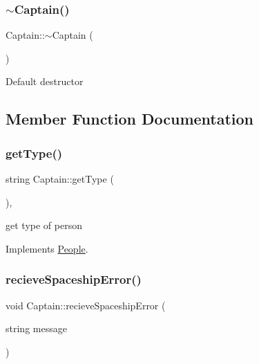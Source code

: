 \subsubsection{\texorpdfstring{$\sim$\+Captain()}{~Captain()}}
{\footnotesize\ttfamily Captain\+::$\sim$\+Captain (\begin{DoxyParamCaption}{ }\end{DoxyParamCaption})\hspace{0.3cm}{\ttfamily [inline]}}

Default destructor 

\subsection{Member Function Documentation}
\mbox{\label{classCaptain_a87ae1c47127aec69cc58133d82e488d3}} 
\subsubsection{\texorpdfstring{get\+Type()}{getType()}}
{\footnotesize\ttfamily string Captain\+::get\+Type (\begin{DoxyParamCaption}{ }\end{DoxyParamCaption})\hspace{0.3cm}{\ttfamily [inline]}, {\ttfamily [virtual]}}

get type of person 

Implements \hyperlink{classPeople_af60dd882d60cddf63f9b95815ce551a8}{People}.

\mbox{\label{classCaptain_a39ebd40ec094b410f295188bb6262009}} 
\subsubsection{\texorpdfstring{recieve\+Spaceship\+Error()}{recieveSpaceshipError()}}
{\footnotesize\ttfamily void Captain\+::recieve\+Spaceship\+Error (\begin{DoxyParamCaption}\item[{string}]{message }\end{DoxyParamCaption})\hspace{0.3cm}{\ttfamily [virtual]}}

